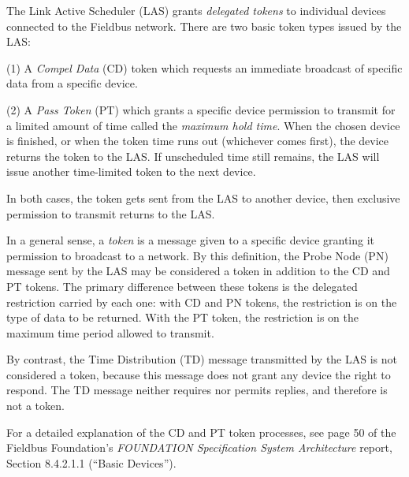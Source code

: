 The Link Active Scheduler (LAS) grants {\it delegated tokens} to individual devices connected to the Fieldbus network.  There are two basic token types issued by the LAS: 

\vskip 10pt

\vskip 10pt {\narrower \noindent \baselineskip5pt

\noindent
(1) A {\it Compel Data} (CD) token which requests an immediate broadcast of specific data from a specific device.

\par} \vskip 10pt

\vskip 10pt {\narrower \noindent \baselineskip5pt

\noindent
(2) A {\it Pass Token} (PT) which grants a specific device permission to transmit for a limited amount of time called the {\it maximum hold time}.  When the chosen device is finished, or when the token time runs out (whichever comes first), the device returns the token to the LAS.  If unscheduled time still remains, the LAS will issue another time-limited token to the next device.

\par} \vskip 10pt

\vskip 10pt

In both cases, the token gets sent from the LAS to another device, then exclusive permission to transmit returns to the LAS.







In a general sense, a {\it token} is a message given to a specific device granting it permission to broadcast to a network.  By this definition, the Probe Node (PN) message sent by the LAS may be considered a token in addition to the CD and PT tokens.  The primary difference between these tokens is the delegated restriction carried by each one: with CD and PN tokens, the restriction is on the type of data to be returned.  With the PT token, the restriction is on the maximum time period allowed to transmit.

By contrast, the Time Distribution (TD) message transmitted by the LAS is not considered a token, because this message does not grant any device the right to respond.  The TD message neither requires nor permits replies, and therefore is not a token.

\vskip 10pt

For a detailed explanation of the CD and PT token processes, see page 50 of the Fieldbus Foundation's {\it FOUNDATION Specification System Architecture} report, Section 8.4.2.1.1 (``Basic Devices'').




